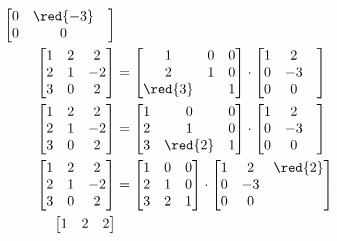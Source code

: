 {\begin{align*}
\begin{bmatrix}
				0 & \red{-3}&\\
				0 & 0 &
			\end{bmatrix} \\
			\begin{bmatrix}
				1& 2& 2\\
				2& 1& -2\\
				3& 0& 2 
			\end{bmatrix} &= 
			\begin{bmatrix}
				1 & 0 & 0\\
				2& 1 & 0\\
				\red{3}&  & 1
			\end{bmatrix} \cdot
			\begin{bmatrix}
				1& 2& \\
				0 & -3&\\
				0 & 0 &
			\end{bmatrix} \\
			\begin{bmatrix}
				1& 2& 2\\
				2& 1& -2\\
				3& 0& 2 
			\end{bmatrix} &= 
			\begin{bmatrix}
				1 & 0 & 0\\
				2& 1 & 0\\
				3& \red{2} & 1
			\end{bmatrix} \cdot
			\begin{bmatrix}
				1& 2& \\
				0 & -3&\\
				0 & 0 &
			\end{bmatrix} \\
			\begin{bmatrix}
				1& 2& 2\\
				2& 1& -2\\
				3& 0& 2 
			\end{bmatrix} &= 
			\begin{bmatrix}
				1 & 0 & 0\\
				2& 1 & 0\\
				3& 2 & 1
			\end{bmatrix} \cdot
			\begin{bmatrix}
				1& 2& \red{2}\\
				0 & -3&\\
				0 & 0 &
			\end{bmatrix} \\
			\begin{bmatrix}
				1& 2& 2\\

\end{bmatrix}
\end{align*}}
